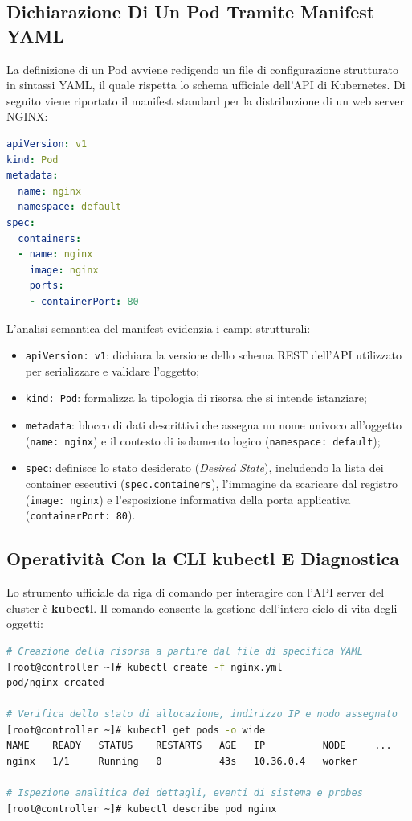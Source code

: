 \documentclass[11pt, a4paper]{article}
\begin{document}
\subsection{Dichiarazione Di Un Pod Tramite Manifest YAML}
La definizione di un Pod avviene redigendo un file di configurazione strutturato in sintassi YAML, il quale rispetta lo schema ufficiale dell'API di Kubernetes. Di seguito viene riportato il manifest standard per la distribuzione di un web server NGINX:

\begin{lstlisting}[language=yaml, caption={Manifest dichiarativo per la creazione di un Pod semplice (\texttt{nginx.yml}).}]
apiVersion: v1
kind: Pod
metadata:
  name: nginx
  namespace: default
spec:
  containers:
  - name: nginx
    image: nginx
    ports:
    - containerPort: 80
\end{lstlisting}

L'analisi semantica del manifest evidenzia i campi strutturali:
\begin{itemize}[noitemsep]
    \item \texttt{apiVersion: v1}: dichiara la versione dello schema REST dell'API utilizzato per serializzare e validare l'oggetto;
    \item \texttt{kind: Pod}: formalizza la tipologia di risorsa che si intende istanziare;
    \item \texttt{metadata}: blocco di dati descrittivi che assegna un nome univoco all'oggetto (\texttt{name: nginx}) e il contesto di isolamento logico (\texttt{namespace: default});
    \item \texttt{spec}: definisce lo stato desiderato (\emph{Desired State}), includendo la lista dei container esecutivi (\texttt{spec.containers}), l'immagine da scaricare dal registro (\texttt{image: nginx}) e l'esposizione informativa della porta applicativa (\texttt{containerPort: 80}).
\end{itemize}

\subsection{Operatività Con la CLI kubectl E Diagnostica}
Lo strumento ufficiale da riga di comando per interagire con l'API server del cluster è \textbf{kubectl}. Il comando consente la gestione dell'intero ciclo di vita degli oggetti:

\begin{lstlisting}[language=bash, caption={Comandi operativi per la creazione e ispezione dello stato del Pod.}]
# Creazione della risorsa a partire dal file di specifica YAML
[root@controller ~]# kubectl create -f nginx.yml
pod/nginx created

# Verifica dello stato di allocazione, indirizzo IP e nodo assegnato
[root@controller ~]# kubectl get pods -o wide
NAME    READY   STATUS    RESTARTS   AGE   IP          NODE     ...
nginx   1/1     Running   0          43s   10.36.0.4   worker

# Ispezione analitica dei dettagli, eventi di sistema e probes
[root@controller ~]# kubectl describe pod nginx
\end{lstlisting}
\end{document}
